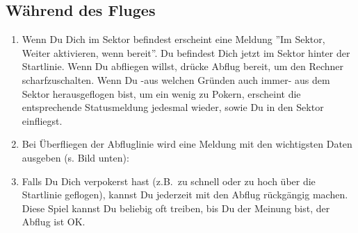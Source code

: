 \subsection*{Während des Fluges}
\begin{enumerate}
\item  Wenn Du Dich im Sektor  befindest erscheint eine Meldung ''\textsf{Im Sektor, Weiter aktivieren, wenn bereit}''.
Du befindest Dich jetzt im Sektor hinter der Startlinie. Wenn Du abfliegen willst,  drücke Abflug bereit, um
 den Rechner scharfzuschalten.
 Wenn Du -aus welchen Gründen auch immer- aus dem Sektor herausgeflogen bist, um ein wenig zu Pokern,
erscheint die entsprechende Statusmeldung jedesmal wieder, sowie Du in den Sektor einfliegst.
\item Bei Überfliegen der Abfluglinie wird \xc eine Meldung mit den wichtigsten Daten ausgeben (s. Bild unten):
\item Falls Du Dich verpokerst hast (z.B.\ zu schnell oder zu hoch über die Startlinie geflogen), kannst Du jederzeit mit
 den Abflug rückgängig machen.
Diese Spiel  kannst Du beliebig oft treiben, bis Du der Meinung bist, der Abflug ist OK.


\end{enumerate}
